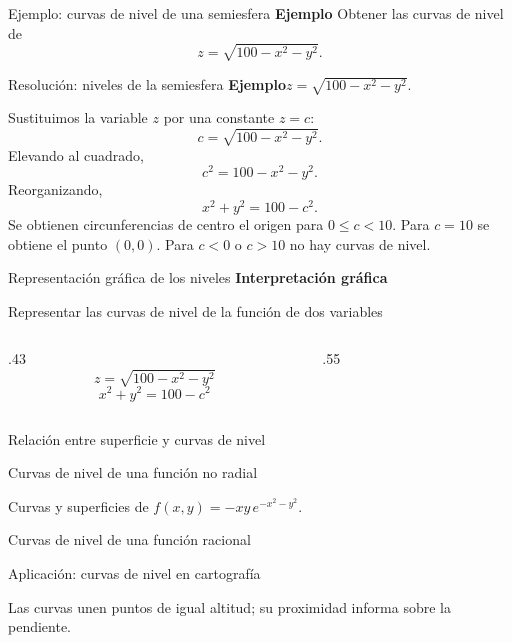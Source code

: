 \documentclass[main.tex]{subfiles}
\begin{document}
\begin{frame}{Ejemplo: curvas de nivel de una semiesfera}
\textbf{Ejemplo}
\vfill
Obtener las curvas de nivel de
\[z=\sqrt{100-x^2-y^2}.\]
\vfill
\end{frame}
\begin{frame}{Resolución: niveles de la semiesfera}
\small\textbf{Ejemplo}\quad $z=\sqrt{100-x^2-y^2}$.
\medskip

Sustituimos la variable $z$ por una constante $z=c$:
\[c=\sqrt{100-x^2-y^2}.\]
Elevando al cuadrado,
\[c^2=100-x^2-y^2.\]
Reorganizando,
\[x^2+y^2=100-c^2.\]
Se obtienen circunferencias de centro el origen para $0\le c<10$. Para $c=10$ se obtiene el punto $(0,0)$. Para $c<0$ o $c>10$ no hay curvas de nivel.
\end{frame}
\begin{frame}{Representación gráfica de los niveles}
\textbf{Interpretación gráfica}\par
Representar las curvas de nivel de la función de dos variables
\begin{columns}[c]
\begin{column}{.43\textwidth}
\[z=\sqrt{100-x^2-y^2}\]
\[x^2+y^2=100-c^2\]
\end{column}
\begin{column}{.55\textwidth}\end{column}
\end{columns}
\end{frame}
\begin{frame}{Relación entre superficie y curvas de nivel}
\end{frame}
\begin{frame}{Curvas de nivel de una función no radial}
\begin{center}\scriptsize Curvas y superficies de $f(x,y)=-xy\,e^{-x^2-y^2}$.\end{center}
\end{frame}
\begin{frame}{Curvas de nivel de una función racional}
\end{frame}
\begin{frame}{Aplicación: curvas de nivel en cartografía}
\begin{center}\scriptsize Las curvas unen puntos de igual altitud; su proximidad informa sobre la pendiente.\end{center}
\end{frame}
\end{document}
